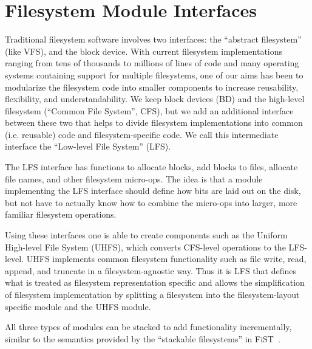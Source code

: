 \section{Filesystem Module Interfaces}
\label{sec:interfaces}

Traditional filesystem software involves two interfaces: the ``abstract
filesystem'' (like VFS), and the block device. With current filesystem
implementations ranging from tens of thousands to millions of lines of code and
many operating systems containing support for multiple filesystems, one of our
aims has been to modularize the filesystem code into smaller components to
increase reusability, flexibility, and understandability. We keep block devices
(BD) and the high-level filesystem (``Common File System'', CFS), but we add an
additional interface between these two that helps to divide filesystem
implementations into common (i.e. reusable) code and filesystem-specific code.
We call this intermediate interface the ``Low-level File System'' (LFS).

The LFS interface has functions to allocate blocks, add blocks to files,
allocate file names, and other filesystem micro-ops. The idea is that a module
implementing the LFS interface should define how bits are laid out on the disk,
but not have to actually know how to combine the micro-ops into larger, more
familiar filesystem operations.

Using these interfaces one is able to create components such as the Uniform
High-level File System (UHFS), which converts CFS-level operations to the
LFS-level. UHFS implements common filesystem functionality such as file write,
read, append, and truncate in a filesystem-agnostic way. Thus it is LFS that
defines what is treated as filesystem representation specific and allows the
simplification of filesystem implementation by splitting a filesystem into the
filesystem-layout specific module and the UHFS module.

All three types of modules can be stacked to add functionality incrementally,
similar to the semantics provided by the ``stackable filesystems'' in
FiST~\cite{zadok00fist}.
